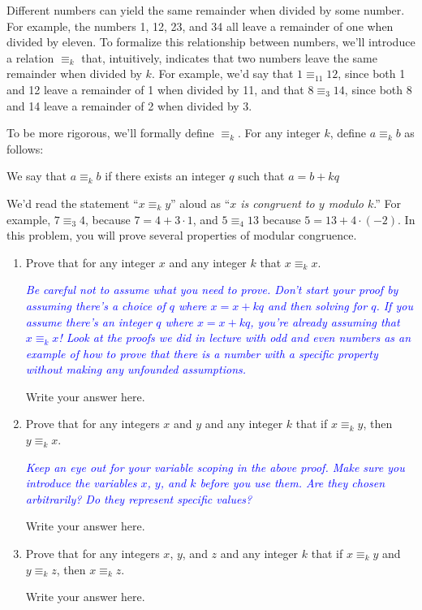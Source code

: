 \documentclass{article}
\renewcommand{\(}{\left(}
\renewcommand{\)}{\right)}
\theoremstyle{plain}
\theoremstyle{plain}
\theoremstyle{definition}
\begin{document}
Different numbers can yield the same remainder when divided by some number. For example, the numbers 1, 12, 23, and 34 all leave a remainder of one when divided by eleven. To formalize this relationship between numbers, we'll introduce a relation $\equiv_k$ that, intuitively, indicates that two numbers leave the same remainder when divided by $k$. For example, we'd say that $1 \equiv_{11} 12$, since both 1 and 12 leave a remainder of 1 when divided by 11, and that $8 \equiv_3 14$, since both 8 and 14 leave a remainder of 2 when
divided by 3. 

To be more rigorous, we'll formally define $\equiv_k$. For any integer $k$, define $a \equiv_k b$ as follows:
\begin{center}
    We say that $a \equiv_k b$ if there exists an integer $q$ such that $a = b + kq$
\end{center}

We'd read the statement ``$x \equiv_k y$'' aloud as ``\textit{$x$ is congruent to $y$ modulo $k$}.'' For example, $7 \equiv_3 4$, because $7 = 4 + 3 \cdot 1$, and $5 \equiv_4 13$ because $5 = 13 + 4 \cdot (-2)$. 
In this problem, you will prove several properties of modular congruence.

\begin{enumerate}[label*=\roman*.,ref=\roman*]

\item Prove that for any integer $x$ and any integer $k$ that $x \equiv_k x$.

\textit{\textcolor{blue}{Be careful not to assume what you need to prove. Don't start your proof by assuming there's a choice of $q$ where $x = x + kq$ and then solving for $q$. If you assume there's an integer $q$ where $x = x + kq$, you're already assuming that $x \equiv_k x$! Look at the proofs we did in lecture with odd and even numbers as an example of how to prove that there is a number with a specific property without making any unfounded assumptions.}}

\begin{shaded}
Write your answer here.
\end{shaded}

\item Prove that for any integers $x$ and $y$ and any integer $k$ that if $x \equiv_k y$, then $y \equiv_k x$.

\textit{\textcolor{blue}{Keep an eye out for your variable scoping in the above proof. Make sure you introduce the variables $x$, $y$, and $k$ before you use them. Are they chosen arbitrarily? Do they represent specific values?}}

\begin{shaded}
Write your answer here.
\end{shaded}

\item Prove that for any integers $x$, $y$, and $z$ and any integer $k$ that if $x \equiv_k y$ and $y \equiv_k z$, then $x \equiv_k z$.

\begin{shaded}
Write your answer here.
\end{shaded}

\end{enumerate}
\end{document}
